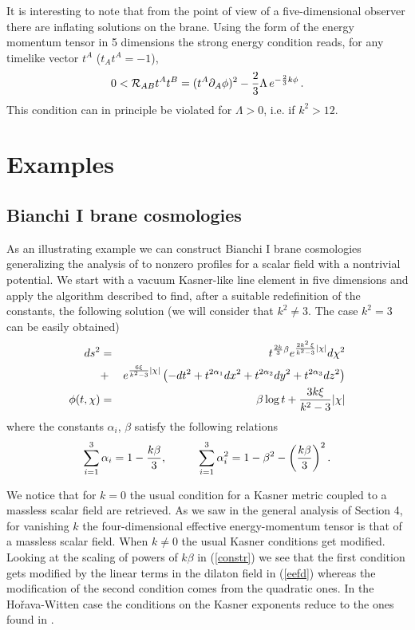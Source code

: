 \documentclass[prd,a4paper,twocolumn,superscriptaddress,nofootinbib,showpacs]{revtex4}
\begin{document}
It is interesting to note that from the point of view of a
five-dimensional observer there are inflating solutions on the
brane. Using the form of the energy momentum tensor in 5 dimensions
the strong energy condition reads, for any timelike vector $t^{A}$ ($t_{A}t^{A}=-1$),
$$
0<{\cal R}_{AB}t^At^B=(t^A\partial_{A}\phi)^2-{2\over3}\Lambda\, e^{-{2\over 3}k\phi}\, .
$$
This condition can in principle be violated for $\Lambda>0$, i.e.
if $k^2>12$.








\section{Examples}

\subsection{Bianchi I brane cosmologies}

As an illustrating example we can construct Bianchi I brane cosmologies generalizing the 
analysis of \cite{fr} to nonzero profiles for a scalar field with a nontrivial potential. 
We start with a vacuum Kasner-like line element in five dimensions and apply the algorithm described 
to find, after a suitable redefinition of the constants, the following solution (we will
consider that $k^2\neq 3$. The case $k^2=3$ can be easily obtained)
\begin{eqnarray}
ds^2&=&t^{{2k\over 3}\beta} e^{{2k^2\,\xi\over k^2-3}|\chi|}d\chi^2 \nonumber \\
&+&e^{{6\xi\over k^2-3}|\chi|}\left(-dt^2+t^{2\alpha_{1}}dx^2+t^{2\alpha_{2}}dy^2+t^{2\alpha_{3}}dz^2
\right)\nonumber \\
\phi(t,\chi)&=& \beta\log{t}+{3k\xi\over k^2-3}|\chi| \nonumber 
\end{eqnarray}
where the constants $\alpha_{i}$, $\beta$ satisfy the following relations
\begin{equation}
\sum_{i=1}^{3}\alpha_{i}=1-{k\beta\over 3}, \hskip 1cm \sum_{i=1}^{3}\alpha_{i}^{2}=1-\beta^2
-\left({k\beta\over 3}\right)^2 .
\label{constr}
\end{equation}

We notice that for $k=0$ the usual condition for a Kasner metric coupled to a massless scalar field are retrieved.
As we saw in the general analysis of Section 4, for vanishing $k$ the four-dimensional effective energy-momentum tensor
is that of a massless scalar field. When $k\neq 0$ the usual Kasner conditions get modified. Looking at the scaling
of powers of $k\beta$ in (\ref{constr}) we see that the first condition gets modified by the linear terms in the
dilaton field in (\ref{eefd}) whereas the modification of the second condition comes from the quadratic ones.
In the Ho\v{r}ava-Witten case the conditions on the Kasner exponents reduce to the ones found in 
\cite{dabr}.
\end{document}
